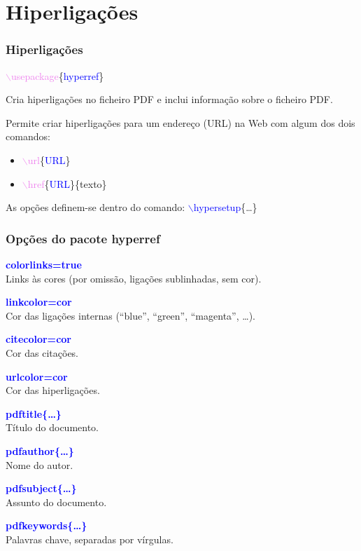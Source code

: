 \documentclass{beamer}
\begin{document}
\section{Hiperligações}
\begin{frame}
\frametitle{Hiperligações}
\qquad\textcolor{violet}{$\backslash$usepackage}\{\textcolor{blue}{hyperref}\}

Cria hiperligações no ficheiro PDF e inclui informação sobre o
ficheiro PDF.\pause

Permite criar hiperligações para um endereço (URL) na Web com algum dos dois
comandos:\pause
\begin{itemize}
\item \textcolor{violet}{$\backslash$url}\{\textcolor{blue}{URL}\}\pause
\item \textcolor{violet}{$\backslash$href}\{\textcolor{blue}{URL}\}\{texto\}\pause
\end{itemize}

As opções definem-se dentro do comando: \textcolor{blue}{$\backslash$hypersetup}\{\ldots\}
\end{frame}
\begin{frame}
\frametitle{Opções do pacote hyperref}
{\setlength{\parskip}{0.2em}
\textcolor{blue}{\bfseries colorlinks=true}\\
\quad Links às cores (por omissão, ligações sublinhadas, sem cor).\pause

\textcolor{blue}{\bfseries linkcolor=cor}\\
\quad Cor das ligações internas (``blue'', ``green'', ``magenta'', \ldots).\pause

\textcolor{blue}{\bfseries citecolor=cor}\\
\quad Cor das citações.\pause

\textcolor{blue}{\bfseries urlcolor=cor}\\
\quad Cor das hiperligações.\pause

\textcolor{blue}{\bfseries pdftitle\{\ldots\}}\\
\quad Título do documento.\pause

\textcolor{blue}{\bfseries pdfauthor\{\ldots\}}\\
\quad Nome do autor.\pause

\textcolor{blue}{\bfseries pdfsubject\{\ldots\}}\\
\quad Assunto do documento.\pause

\textcolor{blue}{\bfseries pdfkeywords\{\ldots\}}\\
\quad Palavras chave, separadas por vírgulas.}
\end{frame}
\end{document}
